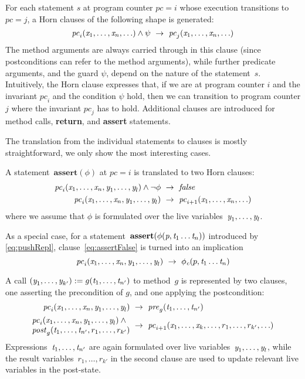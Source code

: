 For each statement $s$ at program counter $\mathit{pc}=i$ whose
execution transitions to $\mathit{pc}=j$, a Horn
clauses of the following shape is generated:
%
\[
\mathit{pc}_i(\textit{x}_1,\ldots, \textit{x}_n, \ldots) \wedge \psi ~\to~
\mathit{pc}_j(\textit{x}_1,\ldots,\textit{x}_n, \ldots) \]
%
The method arguments are always carried through in this clause (since
postconditions can refer to the method arguments), while further
predicate arguments, and the guard $\psi$, depend on the nature of the
statement~$s$. Intuitively, the Horn clause expresses that, if we are
at program counter $i$ and the invariant $\mathit{pc}_i$ and the
condition $\psi$ hold, then we can transition to program counter $j$
where the invariant $\mathit{pc}_j$ has to hold. Additional clauses
are introduced for method calls, \textbf{return}, and \textbf{assert}
statements.

%
The translation from the individual statements to clauses is mostly
straightforward, we only show the most interesting cases.


A statement~$\textbf{assert}(\phi)$ at $\mathit{pc}=i$ is translated
to two Horn clauses:
\begin{align}
  \label{eq:assertFalse}
  \mathit{pc}_i(\textit{x}_1,\ldots, \textit{x}_n, \textit{y}_1, \ldots, \textit{y}_l)
  \wedge \neg \phi &~\to~
  \mathit{false}
  \\
  \notag
  \mathit{pc}_i(\textit{x}_1,\ldots, \textit{x}_n, \textit{y}_1, \ldots, \textit{y}_l) &~\to~
  \mathit{pc}_{i+1}(\textit{x}_1,\ldots,\textit{x}_n, \ldots)
\end{align}
where we assume that $\phi$ is formulated over the live
variables~$\textit{y}_1, \ldots, \textit{y}_l$.

As a special case, for a statement~$\textbf{assert}(\phi(\textit{p},
\textit{t}_1 \ldots \textit{t}_n))$ introduced by \eqref{eq:pushRepl},
clause~\eqref{eq:assertFalse} is turned into an implication
\begin{equation*}
  \mathit{pc}_i(\textit{x}_1,\ldots, \textit{x}_n, \textit{y}_1, \ldots, \textit{y}_l) ~\to~
  \phi_\textit{c}(p, \textit{t}_1 \ldots \textit{t}_n)
\end{equation*}


A call $(\textit{y}_1, \ldots, \textit{y}_{k'}) := g(\textit{t}_1, \ldots,
\textit{t}_{n'})$ to method~$g$ is represented by two clauses,
one asserting the precondition of $g$, and one applying the
postcondition:
\begin{align*}
\mathit{pc}_i(\lvar_1, \ldots, \lvar_n, \lvarp_1, \ldots, \lvarp_l) &
~\to~ \mathit{pre}_g(\expr_1,\ldots,\expr_{n'}) \\
\begin{array}{@{}l@{}}
  \mathit{pc}_i(\lvar_1, \ldots, \lvar_n, \lvarp_1, \ldots, \lvarp_l)
  \wedge\mbox{}
  \\
  \mathit{post}_g(\expr_1,\ldots,\expr_{n'}, r_1, \ldots, r_{k'})
\end{array}
 &
~ \to~ \mathit{pc}_{i+1}(\lvar_1,\ldots,\lvar_k,
\ldots, r_1,\ldots,r_{k'},\ldots)
\end{align*}
Expressions~$\textit{t}_1,\ldots,\textit{t}_{n'}$ are again formulated over live
variables~$\textit{y}_1, \ldots, \textit{y}_l$, while the result
variables~$r_1,\ldots,r_{k'}$ in the second clause are used to update
relevant live variables in the post-state.

